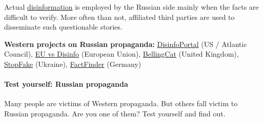 Actual
\href{https://www.wilsoncenter.org/blog-post/operation-denver-kgb-and-stasi-disinformation-regarding-aids}{disinformation}
is employed by the Russian side mainly when the facts are difficult to
verify. More often than not, affiliated third parties are used to
disseminate such questionable stories.

\textbf{Western projects on Russian propaganda:}
\href{https://disinfoportal.org/}{DisinfoPortal} (US / Atlantic
Council), \href{https://euvsdisinfo.eu/}{EU vs­ Dis­info} (European
Union), \href{https://www.bellingcat.com/}{BellingCat} (United Kingdom),
\href{https://www.stopfake.org/en/news/}{StopFake} (Ukraine),
\href{https://faktenfinder.tagesschau.de/ausland/index.html}{FactFinder}
(Germany)

\hypertarget{test-yourself-russian-propaganda}{%
\paragraph{Test yourself: Russian
propaganda}\label{test-yourself-russian-propaganda}}

Many people are victims of Western propaganda. But others fall victim to
Russian propaganda. Are you one of them? Test yourself and find out.


